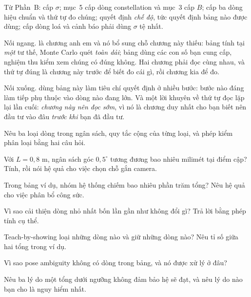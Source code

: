 \documentclass[../../marker.tex]{subfiles}
\begin{document}
Từ Phần~B:  cấp \(\sigma\);  mục~5 cấp dòng constellation và mục~3 cấp \(B\);  cấp ba dòng hiệu chuẩn và thứ tự đo chúng;  quyết định \emph{chế độ}, tức quyết định bảng nào được dùng;  cấp dòng loá và cảnh báo phải dùng \(\sigma\) tệ nhất.

Nối ngang.  là chương anh em và nó bổ sung chỗ chương này thiếu: bảng tính tại \emph{một} tư thế, Monte Carlo quét \emph{toàn dải}; bảng dùng các con số bạn cung cấp, nghiệm thu kiểm xem chúng có đúng không. Hai chương phải đọc cùng nhau, và thứ tự đúng là chương này trước để biết đo cái gì, rồi chương kia để đo.

Nối xuống.  dùng bảng này làm tiêu chí quyết định ở nhiều bước: bước nào đáng làm tiếp phụ thuộc vào dòng nào đang lớn. Và một lời khuyên về thứ tự đọc lặp lại lần cuối: \emph{chương này nên đọc sớm}, vì nó là chương duy nhất cho bạn biết nên đầu tư vào đâu \emph{trước khi} bạn đã đầu tư.

\begin{tukiem}
\item Nêu ba loại dòng trong ngân sách, quy tắc cộng của từng loại, và phép kiểm phân loại bằng hai câu hỏi.
\item Với \(L = 0{,}8\) m, ngân sách góc \(0{,}5^\circ\) tương đương bao nhiêu milimét tại điểm cập? Tính, rồi nói hệ quả cho việc chọn chỗ gắn camera.
\item Trong bảng ví dụ, nhóm hệ thống chiếm bao nhiêu phần trăm tổng? Nêu hệ quả cho việc phân bổ công sức.
\item Vì sao cải thiện dòng nhỏ nhất bốn lần gần như không đổi gì? Trả lời bằng phép tính cụ thể.
\item Teach-by-showing loại những dòng nào và giữ những dòng nào? Nêu tỉ số giữa hai tổng trong ví dụ.
\item Vì sao pose ambiguity không có dòng trong bảng, và nó được xử lý ở đâu?
\item Nêu ba lý do một tổng dưới ngưỡng không đảm bảo hệ sẽ đạt, và nêu lý do nào bạn cho là nguy hiểm nhất.
\end{tukiem}
\ifSubfilesClassLoaded{\printbibliography[title={Nguồn}]}{}
\end{document}
